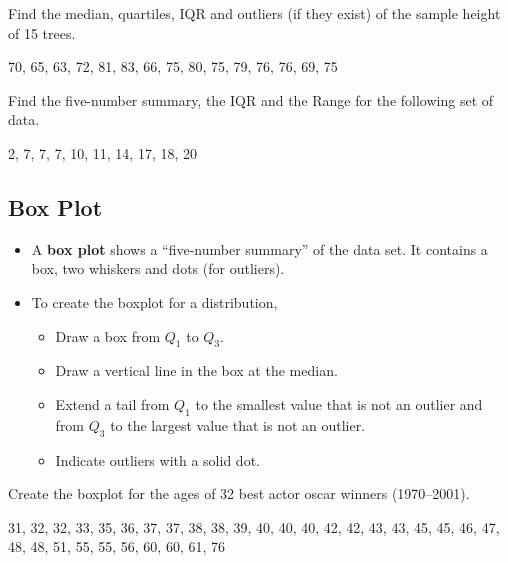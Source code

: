 \begin{example}

Find the median, quartiles, IQR and outliers (if they exist) of the
sample height of 15 trees.

70, 65, 63, 72, 81, 83, 66, 75, 80, 75, 79, 76, 76, 69, 75

\end{example}
\vspace*{8\baselineskip}

\begin{exercise}

Find the five-number summary, the IQR and the Range for the following
set of data.

2, 7, 7, 7, 10, 11, 14, 17, 18, 20

\end{exercise}
\vspace*{6\baselineskip}

\hypertarget{box-plot}{%
\subsection{Box Plot}\label{box-plot}}

\begin{itemize}
\item
  A \textbf{box plot} shows a ``five-number summary'' of the data set.
  It contains a box, two whiskers and dots (for outliers).
\item
  To create the boxplot for a distribution,

  \begin{itemize}
  \item
    Draw a box from \(Q_1\) to \(Q_3\).
  \item
    Draw a vertical line in the box at the median.
  \item
    Extend a tail from \(Q_1\) to the smallest value that is not an
    outlier and from \(Q_3\) to the largest value that is not an
    outlier.
  \item
    Indicate outliers with a solid dot.
  \end{itemize}
\end{itemize}

\begin{example}
  Create the boxplot for the ages of 32 best actor oscar winners
  (1970--2001).
  
  31, 32, 32, 33, 35, 36, 37, 37, 38, 38, 39, 40, 40, 40, 42, 42, 43, 43,
  45, 45, 46, 47, 48, 48, 51, 55, 55, 56, 60, 60, 61, 76
\end{example}
\vspace*{6\baselineskip}

